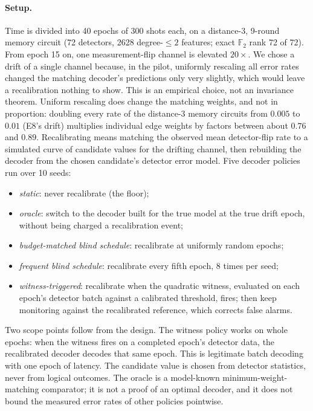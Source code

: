 \paragraph{Setup.} Time is divided into 40 epochs of 300 shots each, on a distance-3, 9-round memory circuit (72 detectors, 2628 degree-$\le 2$ features; exact $\mathbb{F}_2$ rank 72 of 72). %
From epoch 15 on, one measurement-flip channel is elevated $20\times$. We chose a drift of a single channel because, in the pilot, uniformly rescaling all error rates changed the matching decoder's predictions only very slightly, which would leave a recalibration nothing to show. This is an empirical choice, not an invariance theorem. Uniform rescaling does change the matching weights, and not in proportion: doubling every rate of the distance-3 memory circuits from $0.005$ to $0.01$ (E8's drift) multiplies individual edge weights by factors between about $0.76$ and $0.89$. %
Recalibrating means matching the observed mean detector-flip rate to a simulated curve of candidate values for the drifting channel, then rebuilding the decoder from the chosen candidate's detector error model. Five decoder policies run over 10 seeds:
\begin{itemize}[nosep]
\item \emph{static}: never recalibrate (the floor);
\item \emph{oracle}: switch to the decoder built for the true model at the true drift epoch, without being charged a recalibration event;
\item \emph{budget-matched blind schedule}: recalibrate at uniformly random epochs;
\item \emph{frequent blind schedule}: recalibrate every fifth epoch, 8 times per seed;
\item \emph{witness-triggered}: recalibrate when the quadratic witness, evaluated on each epoch's detector batch against a calibrated threshold, fires; then keep monitoring against the recalibrated reference, which corrects false alarms.
\end{itemize}
Two scope points follow from the design. The witness policy works on whole epochs: when the witness fires on a completed epoch's detector data, the recalibrated decoder decodes that same epoch. This is legitimate batch decoding with one epoch of latency. The candidate value is chosen from detector statistics, never from logical outcomes. The oracle is a model-known minimum-weight-matching comparator; it is not a proof of an optimal decoder, and it does not bound the measured error rates of other policies pointwise. %

